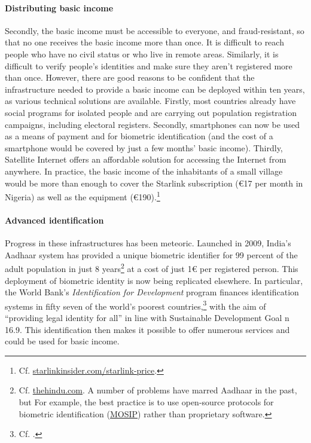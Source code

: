 \documentclass[a5paper,english,openany]{memoir}
\begin{document}
\paragraph{Distributing basic income} %
Secondly, the basic income must be accessible to everyone, %
and fraud-resistant, %
so that no one %
receives the basic income more than once. %
It is difficult to reach people who have no civil status or who live in remote areas. Similarly, it is difficult to verify people's identities and make sure they aren't registered more than once. However, there are good reasons to be confident that the infrastructure needed to provide %
a basic income can be deployed within ten years, as various technical solutions are available. Firstly, most countries already have social programs for isolated people %
and are carrying out population registration campaigns, including electoral registers. %
Secondly, smartphones can now be used as a means of payment and for biometric identification (and the cost of a smartphone would be covered by just a few months' basic income). %
Thirdly, %
Satellite Internet offers an affordable solution for accessing the Internet from anywhere. In practice, the basic income of the inhabitants of a small village would be more than enough to cover the Starlink subscription (\euro{}17 per month in Nigeria) as well as the equipment (\euro{}190).\footnote{Cf. \href{https://starlinkinsider.com/starlink-price/}{starlinkinsider.com/starlink-price}.} %


\paragraph{Advanced identification}
Progress in these infrastructures has been meteoric. Launched in 2009, India's Aadhaar system has provided a unique biometric identifier for 99 percent of the adult population in just 8 years\footnote{Cf. \href{https://www.thehindu.com/business/Aadhaar-covers-99-of-adults-in-India-Prasad/article17104609.ece}{thehindu.com}. 
A number of problems have marred Aadhaar in the past, but %
For example, the best practice is to use open-source protocols for biometric identification (\href{https://mosip.io}{MOSIP}) rather than proprietary software.} at a cost of just 1\euro{} per registered person. This deployment of biometric identity is now being replicated elsewhere. %
In particular, the World Bank's \textit{Identification for Development} program finances identification systems in %
fifty seven of the world's poorest countries,\footnote{Cf. \cite{world_bank_state_2017,world_bank_benin_2020,world_bank_identification_2022}.} with the aim of %
``providing legal identity for all'' in line with Sustainable Development Goal n \textdegree{}16.9. This identification then makes it possible to offer numerous services %
and could be used for %
basic income. 
\end{document}
